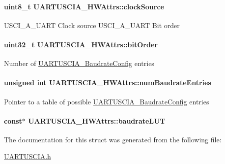 \paragraph[{clock\+Source}]{\setlength{\rightskip}{0pt plus 5cm}uint8\+\_\+t U\+A\+R\+T\+U\+S\+C\+I\+A\+\_\+\+H\+W\+Attrs\+::clock\+Source}\label{struct_u_a_r_t_u_s_c_i_a___h_w_attrs_a4aec72a0ebaedd4a4972448aa01a2250}
U\+S\+C\+I\+\_\+\+A\+\_\+\+U\+A\+R\+T Clock source U\+S\+C\+I\+\_\+\+A\+\_\+\+U\+A\+R\+T Bit order 
\paragraph[{bit\+Order}]{\setlength{\rightskip}{0pt plus 5cm}uint32\+\_\+t U\+A\+R\+T\+U\+S\+C\+I\+A\+\_\+\+H\+W\+Attrs\+::bit\+Order}\label{struct_u_a_r_t_u_s_c_i_a___h_w_attrs_ac37864896a2d13ca7989076a125f1bd0}
Number of \hyperlink{struct_u_a_r_t_u_s_c_i_a___baudrate_config}{U\+A\+R\+T\+U\+S\+C\+I\+A\+\_\+\+Baudrate\+Config} entries 
\paragraph[{num\+Baudrate\+Entries}]{\setlength{\rightskip}{0pt plus 5cm}unsigned int U\+A\+R\+T\+U\+S\+C\+I\+A\+\_\+\+H\+W\+Attrs\+::num\+Baudrate\+Entries}\label{struct_u_a_r_t_u_s_c_i_a___h_w_attrs_ae73e37878acb0ca3f0c5b4209af6dc55}
Pointer to a table of possible \hyperlink{struct_u_a_r_t_u_s_c_i_a___baudrate_config}{U\+A\+R\+T\+U\+S\+C\+I\+A\+\_\+\+Baudrate\+Config} entries 
\paragraph[{baudrate\+L\+U\+T}]{ const$\ast$ U\+A\+R\+T\+U\+S\+C\+I\+A\+\_\+\+H\+W\+Attrs\+::baudrate\+L\+U\+T}\label{struct_u_a_r_t_u_s_c_i_a___h_w_attrs_a5c2588fa1527626c8c6711f825cc96bd}


The documentation for this struct was generated from the following file\+:\begin{DoxyCompactItemize}
\item 
\hyperlink{_u_a_r_t_u_s_c_i_a_8h}{U\+A\+R\+T\+U\+S\+C\+I\+A.\+h}\end{DoxyCompactItemize}
